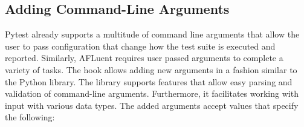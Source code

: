 \subsection{Adding Command-Line Arguments}
\label{subsec:pytest_cli}

Pytest already supports a multitude of command line arguments that allow the
user to pass configuration that change how the test suite is executed and
reported. Similarly, AFLuent requires user passed arguments to complete a
variety of tasks. The hook  allows adding new
arguments in a fashion similar to the  Python library.
The  library supports features that allow easy parsing and validation of
command-line arguments. Furthermore, it facilitates working with input with
various data types.
The added arguments accept values that specify the following:

